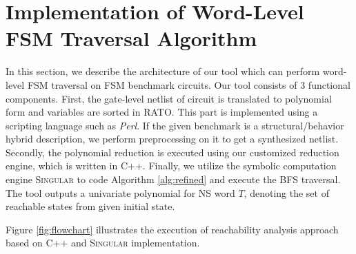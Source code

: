 \section{Implementation of Word-Level FSM Traversal Algorithm}
In this section, we describe the architecture of our tool which can perform word-level FSM traversal
on FSM benchmark circuits. Our tool consists of 3 functional components.
First, the gate-level netlist of circuit is translated to polynomial form and variables are sorted in 
RATO. This part is implemented using a scripting language such as \emph{Perl}. If 
the given benchmark is a structural/behavior hybrid description, we perform preprocessing on it to get a synthesized netlist.
Secondly, the polynomial reduction is executed using our customized reduction engine, which is written in C++.
Finally, we utilize the symbolic computation engine \textsc{Singular} \cite{DGPS} to code Algorithm 
\ref{alg:refined} and execute the BFS traversal. The tool outputs a univariate polynomial 
for NS word $T$, denoting the set of reachable states from given initial state.

Figure \ref{fig:flowchart} illustrates the execution of reachability analysis approach
based on C++ and \textsc{Singular} implementation.

\begin{figure}[bp]
\end{figure}

